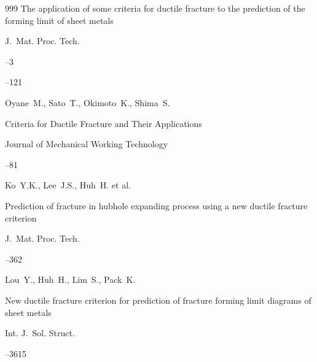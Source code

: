 \begin{thebibliography}{999}
\paper The application of some criteria for ductile fracture to the prediction of the forming limit of sheet metals

\jour J.~Mat. Proc. Tech.



--3

–121







\by Oyane~M., Sato~T., Okimoto~K., Shima~S. 

\paper Criteria for Ductile Fracture and Their Applications

\jour Journal of Mechanical Working Technology




–81





\by Ko~Y.K., Lee~J.S., Huh~H. et al.

\paper Prediction of fracture in hubhole expanding process using a new ductile fracture criterion

\jour J.~Mat. Proc. Tech.



–362






\by Lou~Y., Huh~H., Lim~S., Pack~K. 

\paper New ductile fracture criterion for prediction of fracture forming limit diagrams of sheet metals

\jour Int. J.~Sol. Struct.  




–3615



\end{thebibliography}
